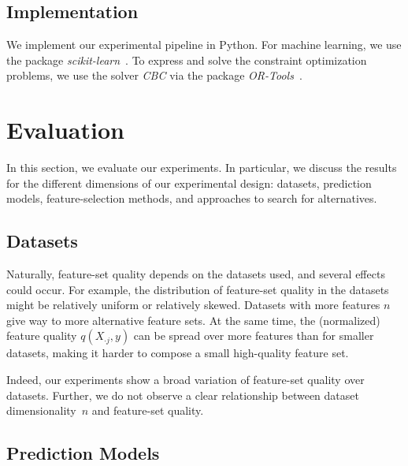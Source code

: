 \documentclass{article}
\theoremstyle{definition}
\begin{document}
\subsection{Implementation}
\label{sec:afs:experimental-design:implementation}

We implement our experimental pipeline in Python.
For machine learning, we use the package \emph{scikit-learn}~\cite{pedregosa2011scikit-learn}.
To express and solve the constraint optimization problems, we use the solver \emph{CBC} via the package \emph{OR-Tools}~\cite{perron2022or-tools}.

\section{Evaluation}
\label{sec:afs:evaluation}

In this section, we evaluate our experiments.
In particular, we discuss the results for the different dimensions of our experimental design:
datasets, prediction models, feature-selection methods, and approaches to search for alternatives.

\subsection{Datasets}
\label{sec:afs:evaluation:datasets}

Naturally, feature-set quality depends on the datasets used, and several effects could occur.
For example, the distribution of feature-set quality in the datasets might be relatively uniform or relatively skewed.
Datasets with more features $n$ give way to more alternative feature sets.
At the same time, the (normalized) feature quality $q(X_{\cdot{}j},y)$ can be spread over more features than for smaller datasets, making it harder to compose a small high-quality feature set.

Indeed, our experiments show a broad variation of feature-set quality over datasets.
Further, we do not observe a clear relationship between dataset dimensionality~$n$ and feature-set quality.

\subsection{Prediction Models}
\label{sec:afs:evaluation:prediction}
\end{document}
